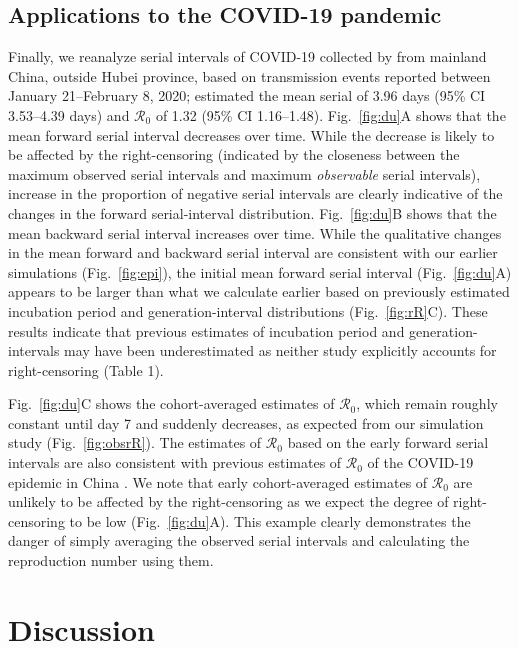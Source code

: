 \documentclass[12pt]{article}
\newcommand{\fref}[1]{Fig.~\ref{fig:#1}}
\newcommand{\Rx}[1]{\ensuremath{{\mathcal R}_{#1}}\xspace}
\newcommand{\Ro}{\Rx{0}}
\begin{document}
\subsection{Applications to the COVID-19 pandemic}

Finally, we reanalyze serial intervals of COVID-19 collected by \cite{du2020serial} from mainland China, outside Hubei province, based on transmission events reported between January 21--February 8, 2020;
\cite{du2020serial} estimated the mean serial of 3.96 days (95\% CI 3.53–4.39 days) and \Ro of 1.32 (95\% CI 1.16–1.48).
\fref{du}A shows that the mean forward serial interval decreases over time.
While the decrease is likely to be affected by the right-censoring (indicated by the closeness between the maximum observed serial intervals and maximum \emph{observable} serial intervals),  increase in the proportion of negative serial intervals are clearly indicative of the changes in the forward serial-interval distribution.
\fref{du}B shows that the mean backward serial interval increases over time.
While the qualitative changes in the mean forward and backward serial interval are consistent with our earlier simulations (\fref{epi}), the initial mean forward serial interval (\fref{du}A) appears to be larger than what we calculate earlier based on previously estimated incubation period and generation-interval distributions (\fref{rR}C).
These results indicate that previous estimates of incubation period and generation-intervals may have been underestimated as neither study explicitly accounts for right-censoring (Table 1).

\fref{du}C shows the cohort-averaged estimates of \Ro, which remain roughly constant until day 7 and suddenly decreases, as expected from our simulation study (\fref{obsrR}).
The estimates of \Ro based on the early forward serial intervals are also consistent with previous estimates of \Ro of the COVID-19 epidemic in China \citep{majumder2020early, park2020reconciling}.
We note that early cohort-averaged estimates of \Ro are unlikely to be affected by the right-censoring as we expect the degree of right-censoring to be low (\fref{du}A).
This example clearly demonstrates the danger of simply averaging the observed serial intervals and calculating the reproduction number using them.

\section{Discussion}
\end{document}

